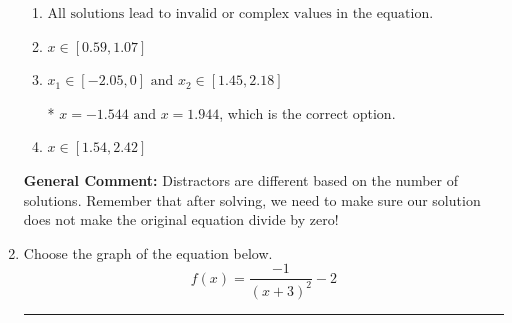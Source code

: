\documentclass{extbook}[14pt]
\newcommand{\litem}[1]{\item #1

\rule{\textwidth}{0.4pt}}
\begin{document}
\begin{enumerate}
{\begin{enumerate}[label=\Alph*.]
\item \( \text{All solutions lead to invalid or complex values in the equation.} \)


\item \( x \in [0.59,1.07] \)


\item \( x_1 \in [-2.05, 0] \text{ and } x_2 \in [1.45,2.18] \)

* $x = -1.544 \text{ and } x = 1.944$, which is the correct option.
\item \( x \in [1.54,2.42] \)


\end{enumerate}

\textbf{General Comment:} Distractors are different based on the number of solutions. Remember that after solving, we need to make sure our solution does not make the original equation divide by zero!
}
\litem{
Choose the graph of the equation below.
\[ f(x) = \frac{-1}{(x + 3)^2} - 2 \]

}
\end{enumerate}
\end{document}
